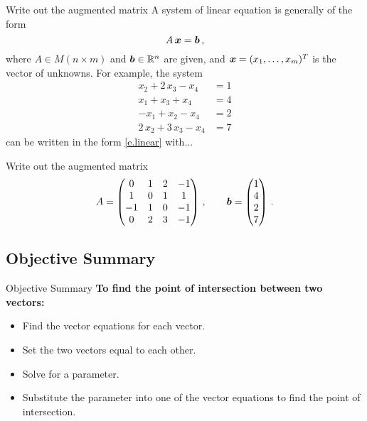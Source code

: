 \begin{frame}{Write out the augmented matrix}
    A system of linear equation is generally of the form
    \begin{equation}
        \label{e.linear}
        A \, \boldsymbol{x} = \boldsymbol{b} \,,
    \end{equation}
    where $A \in M(n \times m)$ and $\boldsymbol{b} \in \mathbb{R}^n$ are given, and $\boldsymbol{x}=(x_1, \dots, x_m)^T$ is the vector of unknowns.  For example, the system
    \begin{align*}
        x_2 + 2 \, x_3 - x_4 & = 1 \\
        x_1 + x_3 + x_4 & = 4 \\
        -x_1 + x_2 - x_4 & = 2 \\
        2 \, x_2 + 3 \, x_3 - x_4 & = 7
    \end{align*}
    can be written in the form \eqref{e.linear} with...
\end{frame}
\begin{frame}{Write out the augmented matrix}
    \begin{equation*}
        A = 
        \begin{pmatrix}
        0 & 1 & 2 & -1 \\
        1 & 0 & 1 & 1 \\
        -1 & 1 & 0 & -1 \\
        0 & 2 & 3 & -1
        \end{pmatrix} \,,
        \qquad \boldsymbol{b} =
        \begin{pmatrix}
        1 \\ 4 \\ 2 \\ 7 
        \end{pmatrix} \,.
      \end{equation*}
\end{frame}
\subsection{Objective Summary}
\frame{\subsectionpage}
\begin{frame}{Objective Summary}
    \textbf{To find the point of intersection between two vectors:}
    \begin{itemize}
        \item<2->{Find the vector equations for each vector.}
        \item<3->{Set the two vectors equal to each other.}
        \item<4->{Solve for a parameter.}
        \item<5->{Substitute the parameter into one of the vector equations to find the point of intersection.}
    \end{itemize}
\end{frame}